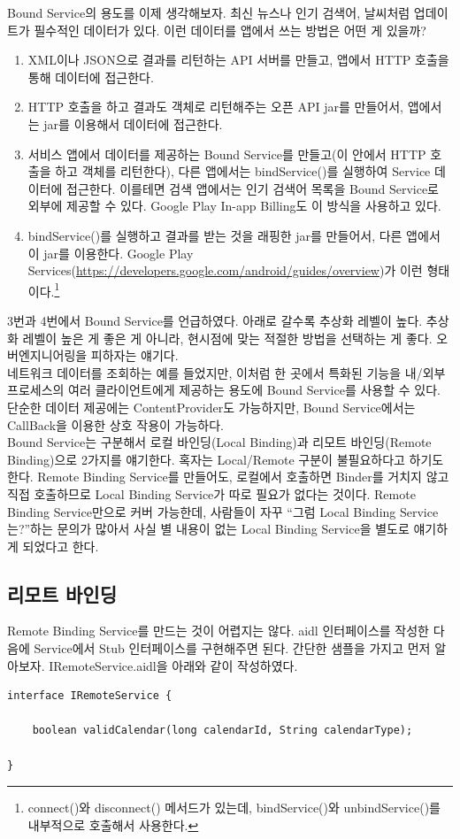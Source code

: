 Bound Service의 용도를 이제 생각해보자.
최신 뉴스나 인기 검색어, 날씨처럼 업데이트가 필수적인 데이터가 있다. 이런 데이터를 앱에서 쓰는 방법은 어떤 게 있을까?
\begin{enumerate}
\item XML이나 JSON으로 결과를 리턴하는 API 서버를 만들고, 앱에서 HTTP 호출을 통해 데이터에 접근한다.
\item HTTP 호출을 하고 결과도 객체로 리턴해주는 오픈 API jar를 만들어서, 앱에서는 jar를 이용해서 데이터에 접근한다.
\item 서비스 앱에서 데이터를 제공하는 Bound Service를 만들고(이 안에서 HTTP 호출을 하고 객체를 리턴한다), 다른 앱에서는 bindService()를 실행하여 Service 데이터에 접근한다. 이를테면 검색 앱에서는 인기 검색어 목록을 Bound Service로 외부에 제공할 수 있다.
Google Play In-app Billing도 이 방식을 사용하고 있다.
\item bindService()를 실행하고 결과를 받는 것을 래핑한 jar를 만들어서, 다른 앱에서 이 jar를 이용한다. Google Play Services(\url{https://developers.google.com/android/guides/overview})가 이런 형태이다.\footnote{connect()와 disconnect() 메서드가 있는데, bindService()와 unbindService()를 내부적으로 호출해서 사용한다.}
\end{enumerate}
3번과 4번에서 Bound Service를 언급하였다. 
아래로 갈수록 추상화 레벨이 높다. 추상화 레벨이 높은 게 좋은 게 아니라, 현시점에 맞는 적절한 방법을 선택하는 게 좋다. 오버엔지니어링을 피하자는 얘기다.\\

네트워크 데이터를 조회하는 예를 들었지만, 이처럼 한 곳에서 특화된 기능을 내/외부 프로세스의 여러 클라이언트에게 제공하는 용도에 Bound Service를 사용할 수 있다. 단순한 데이터 제공에는 ContentProvider도 가능하지만, Bound Service에서는 CallBack을 이용한 상호 작용이 가능하다.\\

Bound Service는 구분해서 로컬 바인딩(Local Binding)과 리모트 바인딩(Remote Binding)으로 2가지를 얘기한다.
혹자는 Local/Remote 구분이 불필요하다고 하기도 한다.
Remote Binding Service를 만들어도, 로컬에서 호출하면 Binder를 거치지 않고 직접 호출하므로 Local Binding Service가 따로 필요가 없다는 것이다. 
Remote Binding Service만으로 커버 가능한데, 사람들이 자꾸 ``그럼 Local Binding Service는?''하는 문의가 많아서 사실 별 내용이 없는 Local Binding Service을 별도로 얘기하게 되었다고 한다.\\

\subsection{리모트 바인딩}
Remote Binding Service를 만드는 것이 어렵지는 않다. aidl 인터페이스를 작성한 다음에 Service에서 Stub 인터페이스를 구현해주면 된다.
간단한 샘플을 가지고 먼저 알아보자. 
IRemoteService.aidl을 아래와 같이 작성하였다. 
\begin{lstlisting}[frame=single]
interface IRemoteService {

	boolean validCalendar(long calendarId, String calendarType);
		
}
\end{lstlisting}

